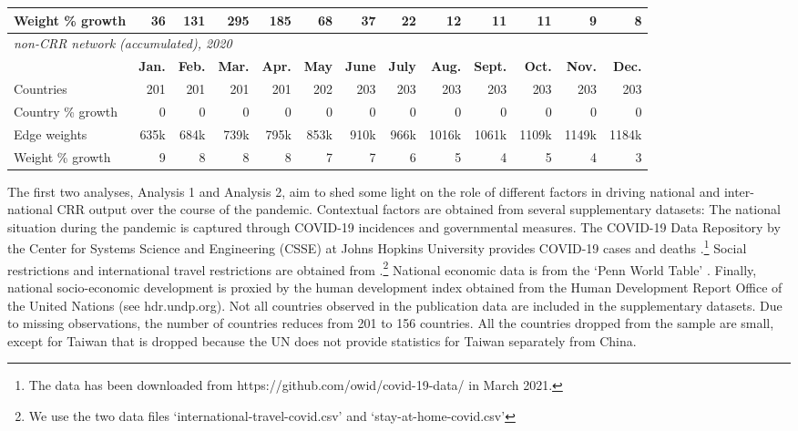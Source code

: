 \begin{table}[ht]
\begin{tabular}{lrrrrrrrrrrrr}
  Weight \% growth & 36 & 131 & 295 & 185 & 68 & 37 & 22 & 12 & 11 & 11 & 9 & 8 \\ 
   \hline
  \hline
 \multicolumn{13}{l}{\textit{non-CRR network (accumulated), 2020}} \\
& {\bf Jan.} & {\bf Feb.} & {\bf Mar.} & {\bf Apr.} &  {\bf May} &  {\bf June} &  {\bf July} &   {\bf Aug.} &  {\bf Sept.} &  {\bf Oct.} &  {\bf Nov.} &  {\bf Dec.} \\   \hline
Countries & 201 & 201 & 201 & 201 & 202 & 203 & 203 & 203 & 203 & 203 & 203 & 203 \\ 
  Country \% growth & 0 & 0 & 0 & 0 & 0 & 0 & 0 & 0 & 0 & 0 & 0 & 0 \\ 
  Edge weights  & 635k & 684k & 739k & 795k & 853k & 910k & 966k & 1016k & 1061k & 1109k & 1149k & 1184k \\ 
  Weight \% growth & 9 & 8 & 8 & 8 & 7 & 7 & 6 & 5 & 4 & 5 & 4 & 3 \\ 
   \hline
\end{tabular}
\end{table}


The first two analyses, Analysis 1 and Analysis 2, aim to shed some light on the role of different factors in driving national and inter-national CRR output over the course of the pandemic. Contextual factors are obtained from several supplementary datasets: The national situation during the pandemic is captured through COVID-19 incidences and governmental measures. The COVID-19 Data Repository by the Center for Systems Science and Engineering (CSSE) at Johns Hopkins University provides COVID-19 cases and deaths \citep{dong2020interactive}.\footnote{The data has been downloaded from https://github.com/owid/covid-19-data/ in March 2021.} Social restrictions and international travel restrictions are obtained from \citet[][]{hale2021global}.\footnote{We use the two data files `international-travel-covid.csv' and `stay-at-home-covid.csv'} National economic data is from the `Penn World Table' \citep{feenstra2015next}. Finally, national socio-economic development is proxied by the human development index obtained from the Human Development Report Office of the United Nations (see hdr.undp.org). Not all countries observed in the publication data are included in the supplementary datasets. Due to missing observations, the number of countries reduces from 201 to 156 countries. All the countries dropped from the sample are small, except for Taiwan that is dropped because the UN does not provide statistics for Taiwan separately from China. 

